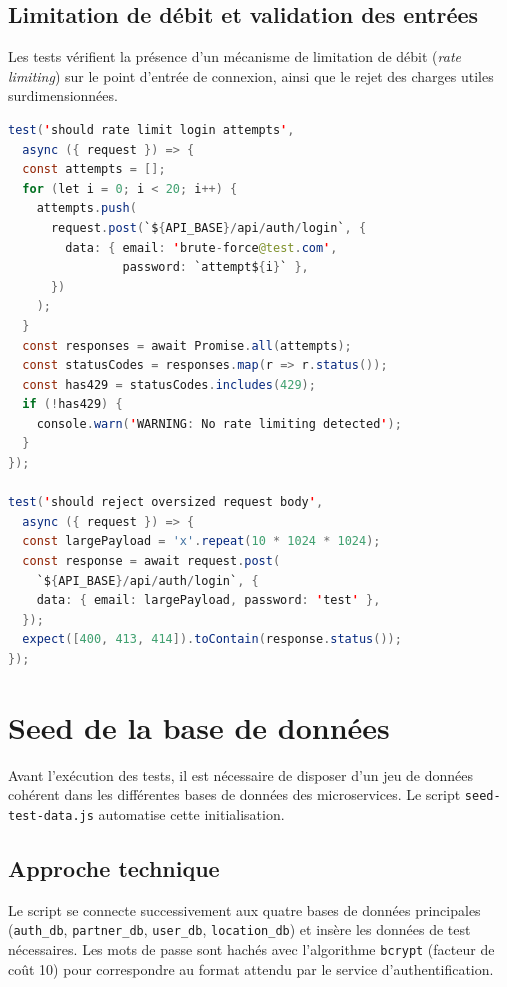 \subsection{Limitation de débit et validation des entrées}

Les tests vérifient la présence d'un mécanisme de limitation de débit (\textit{rate
limiting}) sur le point d'entrée de connexion, ainsi que le rejet des charges utiles
surdimensionnées.

\begin{lstlisting}[language=Java, caption={Tests de limitation de débit}, label={lst:rate-limiting}]
test('should rate limit login attempts',
  async ({ request }) => {
  const attempts = [];
  for (let i = 0; i < 20; i++) {
    attempts.push(
      request.post(`${API_BASE}/api/auth/login`, {
        data: { email: 'brute-force@test.com',
                password: `attempt${i}` },
      })
    );
  }
  const responses = await Promise.all(attempts);
  const statusCodes = responses.map(r => r.status());
  const has429 = statusCodes.includes(429);
  if (!has429) {
    console.warn('WARNING: No rate limiting detected');
  }
});

test('should reject oversized request body',
  async ({ request }) => {
  const largePayload = 'x'.repeat(10 * 1024 * 1024);
  const response = await request.post(
    `${API_BASE}/api/auth/login`, {
    data: { email: largePayload, password: 'test' },
  });
  expect([400, 413, 414]).toContain(response.status());
});
\end{lstlisting}

\section{Seed de la base de données}
\label{sec:seed-database}

Avant l'exécution des tests, il est nécessaire de disposer d'un jeu de données
cohérent dans les différentes bases de données des microservices. Le script
\texttt{seed-test-data.js} automatise cette initialisation.

\subsection{Approche technique}

Le script se connecte successivement aux quatre bases de données principales
(\texttt{auth\_db}, \texttt{partner\_db}, \texttt{user\_db}, \texttt{location\_db})
et insère les données de test nécessaires. Les mots de passe sont hachés avec
l'algorithme \texttt{bcrypt} (facteur de coût 10) pour correspondre au format attendu
par le service d'authentification.

